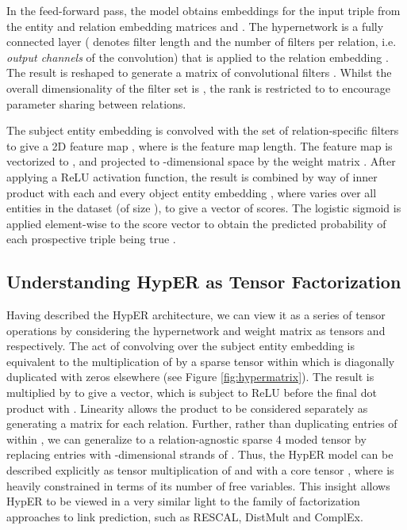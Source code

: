 \documentclass[runningheads]{llncs}
\begin{document}
In the feed-forward pass, the model obtains embeddings for the input triple from the entity and relation embedding matrices  and . The hypernetwork is a fully connected layer  ( denotes filter length and  the number of filters per relation, i.e. \textit{output channels} of the convolution) that is applied to the relation embedding . The result is reshaped to generate a matrix of convolutional filters . Whilst the overall dimensionality of the filter set is , the rank is restricted to  to encourage parameter sharing between relations. 

The subject entity embedding  is convolved with the set of relation-specific filters  to give a 2D feature map , where  is the feature map length. The feature map is vectorized to , and projected to -dimensional space by the weight matrix . After applying a ReLU activation function, the result is combined by way of inner product with each and every object entity embedding , where  varies over all entities in the dataset (of size ), to give a vector of scores. The logistic sigmoid is applied element-wise to the score vector to obtain the predicted probability of each prospective triple being true . 


\subsection{Understanding HypER as Tensor Factorization}

Having described the HypER architecture, we can view it as a series of tensor operations by considering the hypernetwork  and weight matrix  as tensors  and  respectively. The act of convolving  over the subject entity embedding  is equivalent to the multiplication of  by a sparse tensor  within which  is diagonally duplicated with zeros elsewhere (see Figure \ref{fig:hypermatrix}). The result is multiplied by   to give a vector, which is subject to ReLU before the final dot product with . Linearity allows the product  to be considered separately as generating a  matrix for each relation. Further, rather than duplicating entries of  within , we can generalize  to a relation-agnostic sparse 4 moded tensor  by replacing entries with -dimensional strands of . Thus, the HypER model can be described explicitly as tensor multiplication of  and  with a core tensor , where  is heavily constrained in terms of its number of free variables. This insight allows HypER to be viewed in a very similar light to the family of factorization approaches to link prediction, such as RESCAL, DistMult and ComplEx.
\end{document}
